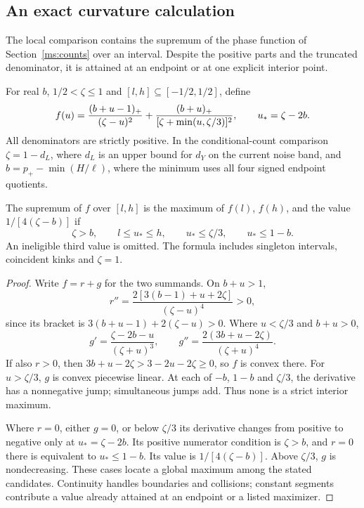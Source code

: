 \subsection{An exact curvature calculation}\label{ms:curvature}

The local comparison contains the supremum of the phase function of
Section~\ref{ms:counts} over an interval. Despite the positive parts and
the truncated denominator, it is attained at an endpoint or at one
explicit interior point.

For real $b$, $1/2<\zeta\le1$ and $[l,h]\subseteq[-1/2,1/2]$, define
\[
 f(u)=\frac{(b+u-1)_+}{(\zeta-u)^2}
       +\frac{(b+u)_+}{[\zeta+\min(u,\zeta/3)]^2},\qquad u_*=\zeta-2b.
\]
All denominators are strictly positive. In the conditional-count comparison $\zeta=1-d_L$, where $d_L$ is an upper bound for $d_Y$ on
the current noise band, and
$b=p_+-\min(H/\ell)$, where the minimum uses all four signed endpoint
quotients.

\begin{theorem}\label{ms:curvature-thm}
The supremum of $f$ over $[l,h]$ is the maximum of $f(l)$, $f(h)$, and
the value $1/[4(\zeta-b)]$ if
\[
 \zeta>b,\qquad l\le u_*\le h,\qquad
 u_*\le \zeta/3,\qquad u_*\le1-b.
\]
An ineligible third value is omitted. The formula includes singleton
intervals, coincident kinks and $\zeta=1$.
\end{theorem}
\begin{proof}
Write $f=r+g$ for the two summands. On $b+u>1$,
\[
 r''=\frac{2[3(b-1)+u+2\zeta]}{(\zeta-u)^4}>0,
\]
since its bracket is $3(b+u-1)+2(\zeta-u)>0$. Where $u<\zeta/3$ and $b+u>0$,
\[
 g'=\frac{\zeta-2b-u}{(\zeta+u)^3},\qquad
 g''=\frac{2(3b+u-2\zeta)}{(\zeta+u)^4}.
\]
If also $r>0$, then $3b+u-2\zeta>3-2u-2\zeta\ge0$, so $f$ is convex there.
For $u>\zeta/3$, $g$ is convex piecewise linear. At each of
$-b$, $1-b$ and $\zeta/3$, the derivative has a nonnegative jump; simultaneous jumps
add. Thus none is a strict interior maximum.

Where $r=0$, either $g=0$, or below $\zeta/3$ its derivative changes from
positive to negative only at $u_*=\zeta-2b$. Its positive numerator condition
is $\zeta>b$, and $r=0$ there is equivalent to $u_*\le1-b$.
Its value is $1/[4(\zeta-b)]$. Above $\zeta/3$, $g$ is nondecreasing.
These cases locate a global maximum among the stated candidates.
Continuity handles boundaries and collisions; constant segments contribute
a value already attained at an endpoint or a listed maximizer.
\end{proof}

